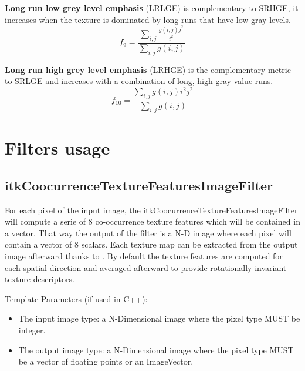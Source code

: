 \documentclass{InsightArticle}
\begin{document}
\textbf{Long run low grey level emphasis} (LRLGE) is complementary to SRHGE, it increases when the texture is dominated by long runs that have low gray levels.
\begin{equation} \label{eqn:ShapeInfluenceTerm}
f_9 = \frac{\sum_{i,j}\nolimits \frac{g(i, j)j^2}{i^2}}{\sum_{i,j}\nolimits g(i, j)}
\end{equation}

\textbf{Long run high grey level emphasis} (LRHGE) is the complementary metric to SRLGE and increases with a combination of long, high-gray value runs.
\begin{equation} \label{eqn:ShapeInfluenceTerm}
f_{10} = \frac{\sum_{i,j}\nolimits g(i, j)i^2j^2}{\sum_{i,j}\nolimits g(i, j)}
\end{equation}

\section{Filters usage}
\label{sec:filterUsage}

\subsection{itkCoocurrenceTextureFeaturesImageFilter}
\label{sec:coocFilter}

For each pixel of the input image, the itkCoocurrenceTextureFeaturesImageFilter will compute a serie of 8 co-occurrence texture features which will be contained in a vector. That way the output of the filter is a N-D image where each pixel will contain a vector of 8 scalars. Each texture map can be extracted from the output image afterward thanks to . By default the texture features are computed for each spatial direction and averaged afterward to provide rotationally invariant texture descriptors.

Template Parameters (if used in C++):
\begin{itemize}
 \item The input image type: a N-Dimensional image where the pixel type MUST be integer.
 \item The output image type: a N-Dimensional image where the pixel type MUST be a vector of floating points or an ImageVector.
\end{itemize}
\end{document}
